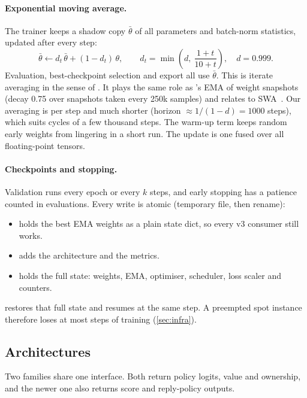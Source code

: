 \paragraph{Exponential moving average.}
The trainer keeps a shadow copy $\bar\theta$ of all parameters and batch-norm statistics,
updated after every step:
\begin{equation}
  \bar\theta \leftarrow d_t\,\bar\theta + (1-d_t)\,\theta,\qquad
  d_t = \min\!\left(d,\ \frac{1+t}{10+t}\right),\quad d = 0.999 .
\end{equation}
Evaluation, best-checkpoint selection and export all use $\bar\theta$. This is iterate
averaging in the sense of \citet{polyak1992acceleration}. It plays the same role as
\katago{}'s EMA of weight snapshots (decay 0.75 over snapshots taken every 250k samples)
and relates to SWA~\citep{izmailov2018averaging}. Our averaging is per step and much
shorter (horizon ${\approx}1/(1-d)=1000$ steps), which suits cycles of a few thousand
steps. The warm-up term keeps random early weights from lingering in a short run. The
update is one fused  over all floating-point tensors.

\paragraph{Checkpoints and stopping.}
Validation runs every epoch or every $k$ steps, and early stopping has a patience counted
in evaluations. Every write is atomic (temporary file, then rename):
\begin{itemize}
  \item {} holds the best EMA weights as a plain state dict, so every v3
        consumer still works.
  \item {} adds the architecture and the metrics.
  \item {} holds the full state: weights, EMA, optimiser, scheduler, loss
        scaler and counters.
\end{itemize}
 restores that full state and resumes at the same step. A preempted
spot instance therefore loses at most  steps of training
(\cref{sec:infra}).

\subsection{Architectures}\label{sec:learner-arch}

Two families share one interface. Both return policy logits, value and ownership, and the
newer one also returns score and reply-policy outputs.

